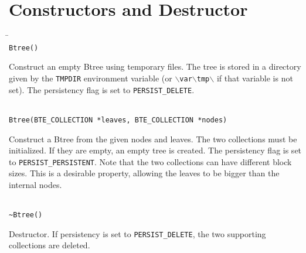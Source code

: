 \documentclass[11pt]{article}
\begin{document}
\section{Constructors and Destructor}

   \begin{tabbing}
   \hspace*{.3in} \= \hspace{.5in} \= \\

   \> {\tt Btree()}\\ 
   \>\>\parbox[t]{5.5in}{Construct an empty Btree using temporary files. 
	The tree is stored in a directory given by the {\tt TMPDIR} 
	environment variable (or 
	{\tt $\backslash$var$\backslash$tmp$\backslash$} if that
	 variable is not set). The persistency flag is set to 
	{\tt PERSIST\_DELETE}.}\\[3mm]

   \> {\tt Btree(BTE\_COLLECTION *leaves, BTE\_COLLECTION *nodes)}\\ 
   \>\>\parbox[t]{5.5in}{Construct a Btree from the given nodes and leaves.
	The two collections must be initialized. If they are empty, an
	empty tree is created. The persistency flag is set to 
	{\tt PERSIST\_PERSISTENT}. Note that the two collections can
	have different block sizes. This is a desirable property, 
	allowing the leaves to be bigger than the internal nodes.}\\[3mm]

   \> {\tt \verb|~|Btree()}\\ 
   \>\>\parbox[t]{5.5in}{Destructor. If persistency is set to 
	{\tt PERSIST\_DELETE}, the two supporting collections are deleted.}

   \end{tabbing}
\end{document}
